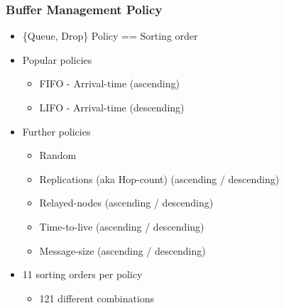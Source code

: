 \begin{frame}
  \frametitle{Buffer Management Policy}
  \begin{itemize}
    \item \{Queue, Drop\} Policy == Sorting order
    \vspace{0.3cm}
    \item Popular policies
    \begin{itemize}
      \item FIFO - Arrival-time (ascending)
      \item LIFO - Arrival-time (descending)
    \end{itemize}
    \vspace{0.3cm}
    \item Further policies
    \begin{itemize}
      \item Random
      \item Replications (aka Hop-count) (ascending / descending)
      \item Relayed-nodes (ascending / descending)
      \item Time-to-live (ascending / descending)
      \item Message-size (ascending / descending)
    \end{itemize}
    \vspace{0.3cm}
    \item 11 sorting orders per policy
    \begin{itemize}
      \item 121 different combinations
    \end{itemize}
  \end{itemize}
\end{frame}
